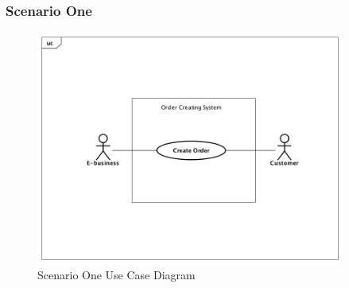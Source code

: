 \documentclass[12pt]{scrreprt}
\begin{document}
\subsubsection{Scenario One}
\begin{figure}[H]
  \centering\includegraphics[width=4in]{DocumentRes/1UseCaseDiagram.png}
  \caption{Scenario One Use Case Diagram}
\end{figure}
\end{document}
